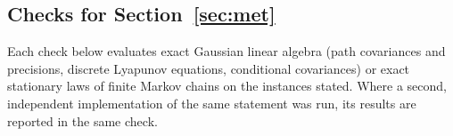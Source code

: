 \subsection{Checks for \texorpdfstring{Section~\ref{sec:met}}{meta-agents as agents}}\label{chk:met}

Each check below evaluates exact Gaussian linear algebra (path covariances and precisions, discrete Lyapunov equations, conditional covariances) or exact stationary laws of finite Markov chains on the instances stated. Where a second, independent implementation of the same statement was run, its results are reported in the same check.

